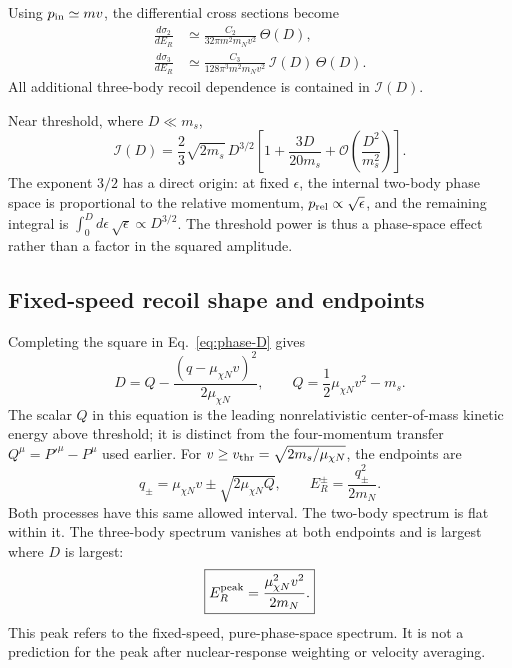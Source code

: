 \documentclass[prd,showpacs,preprintnumbers,amsmath,amssymb,twocolumn,
superscriptaddress,notitlepage]{revtex4-2}
\begin{document}
Using $p_{\rm in}\simeq mv$, the differential cross sections become
\begin{equation}
\boxed{\begin{aligned}
\frac{d\sigma_2}{dE_R}
&\simeq
\frac{C_2}{32\pi m^2m_Nv^2}\,\Theta(D),\\[1mm]
\frac{d\sigma_3}{dE_R}
&\simeq
\frac{C_3}{128\pi^3m^2m_Nv^2}\,
\mathcal{I}(D)\,\Theta(D).
\end{aligned}}
\label{eq:phase-cross-sections}
\end{equation}
All additional three-body recoil dependence is contained in
$\mathcal{I}(D)$.

Near threshold, where $D\ll m_s$,
\begin{equation}
\boxed{
\mathcal{I}(D)
=
\frac23\sqrt{2m_s}\,D^{3/2}
\left[
1+\frac{3D}{20m_s}
+\mathcal{O}\!\left(\frac{D^2}{m_s^2}\right)
\right].
}
\label{eq:phase-threshold-expansion}
\end{equation}
The exponent $3/2$ has a direct origin: at fixed $\epsilon$, the
internal two-body phase space is proportional to the relative momentum,
$p_{\rm rel}\propto\sqrt{\epsilon}$, and the remaining integral is
$\int_0^D d\epsilon\,\sqrt{\epsilon}\propto D^{3/2}$.
The threshold power is thus a phase-space effect rather than a factor
in the squared amplitude.

\subsection{Fixed-speed recoil shape and endpoints}

Completing the square in Eq.~\eqref{eq:phase-D} gives
\begin{equation}
\boxed{
D=Q-\frac{(q-\mu_{\chi N}v)^2}{2\mu_{\chi N}},
\qquad
Q=\frac12\mu_{\chi N}v^2-m_s.
}
\label{eq:phase-complete-square}
\end{equation}
The scalar $Q$ in this equation is the leading nonrelativistic
center-of-mass kinetic energy above threshold; it is distinct from the
four-momentum transfer $Q^\mu=P'^\mu-P^\mu$ used earlier.
For $v\geq v_{\rm thr}=\sqrt{2m_s/\mu_{\chi N}}$, the endpoints are
\begin{equation}
q_\pm=\mu_{\chi N}v\pm\sqrt{2\mu_{\chi N}Q},\qquad
E_R^\pm=\frac{q_\pm^2}{2m_N}.
\label{eq:phase-endpoints}
\end{equation}
Both processes have this same allowed interval.
The two-body spectrum is flat within it. The three-body spectrum
vanishes at both endpoints and is largest where $D$ is largest:
\begin{equation}
\boxed{
E_R^{\rm peak}=\frac{\mu_{\chi N}^2v^2}{2m_N}.
}
\label{eq:phase-peak}
\end{equation}
This peak refers to the fixed-speed, pure-phase-space spectrum.
It is not a prediction for the peak after nuclear-response weighting
or velocity averaging.
\end{document}
